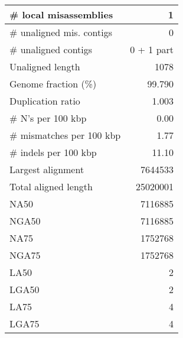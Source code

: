\documentclass[12pt,a4paper]{article}
\begin{document}
\begin{table}[ht]
\begin{center}
\begin{tabular}{|l*{1}{|r}|}
\# local misassemblies & 1 \\ \hline
\# unaligned mis. contigs & 0 \\ \hline
\# unaligned contigs & 0 + 1 part \\ \hline
Unaligned length & 1078 \\ \hline
Genome fraction (\%) & 99.790 \\ \hline
Duplication ratio & 1.003 \\ \hline
\# N's per 100 kbp & 0.00 \\ \hline
\# mismatches per 100 kbp & 1.77 \\ \hline
\# indels per 100 kbp & 11.10 \\ \hline
Largest alignment & 7644533 \\ \hline
Total aligned length & 25020001 \\ \hline
NA50 & 7116885 \\ \hline
NGA50 & 7116885 \\ \hline
NA75 & 1752768 \\ \hline
NGA75 & 1752768 \\ \hline
LA50 & 2 \\ \hline
LGA50 & 2 \\ \hline
LA75 & 4 \\ \hline
LGA75 & 4 \\ \hline
\end{tabular}
\end{center}
\end{table}
\end{document}
